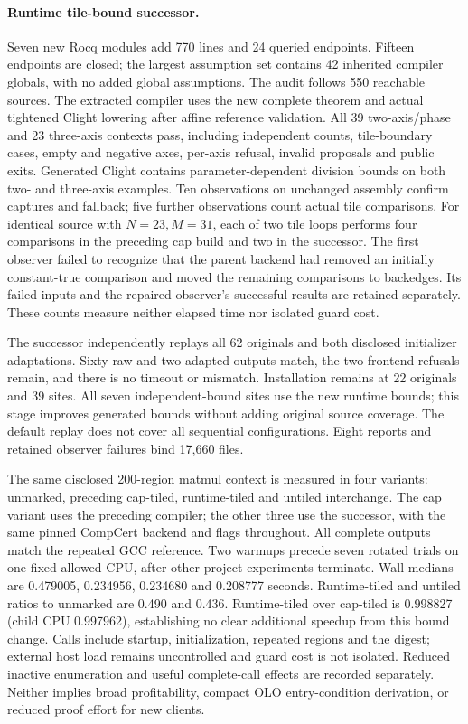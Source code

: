 \paragraph{Runtime tile-bound successor.}
Seven new Rocq modules add 770 lines and 24 queried endpoints. Fifteen endpoints
are closed; the largest assumption set contains 42 inherited compiler globals,
with no added global assumptions. The audit follows 550 reachable sources.
The extracted compiler uses the new complete theorem and actual tightened
Clight lowering after affine reference validation. All 39 two-axis/phase and
23 three-axis contexts pass, including independent counts, tile-boundary cases,
empty and negative axes, per-axis refusal, invalid proposals and public exits.
Generated Clight contains parameter-dependent division bounds on both two- and
three-axis examples. Ten observations on unchanged assembly confirm captures
and fallback; five further observations count actual tile comparisons.
For identical source with $N=23,M=31$, each of two tile loops performs four
comparisons in the preceding cap build and two in the successor. The first
observer failed to recognize that the parent backend had removed an initially
constant-true comparison and moved the remaining comparisons to backedges.
Its failed inputs and the repaired observer's successful results are retained
separately. These counts measure neither elapsed time nor isolated guard cost.

The successor independently replays all 62 originals and both disclosed
initializer adaptations. Sixty raw and two adapted outputs match, the two
frontend refusals remain, and there is no timeout or mismatch. Installation
remains at 22 originals and 39 sites. All seven independent-bound sites use
the new runtime bounds; this stage improves generated bounds without adding
original source coverage. The default replay does not cover all sequential
configurations. Eight reports and retained observer failures bind 17,660 files.

The same disclosed 200-region matmul context is measured in four variants:
unmarked, preceding cap-tiled, runtime-tiled and untiled interchange. The cap
variant uses the preceding compiler; the other three use the successor, with
the same pinned CompCert backend and flags throughout. All complete outputs
match the repeated GCC reference. Two warmups precede seven rotated trials
on one fixed allowed CPU, after other project experiments terminate. Wall
medians are 0.479005, 0.234956, 0.234680 and 0.208777 seconds. Runtime-tiled and
untiled ratios to unmarked are 0.490 and 0.436. Runtime-tiled over cap-tiled is
0.998827 (child CPU 0.997962), establishing no clear additional speedup from
this bound change. Calls include startup, initialization, repeated regions and
the digest; external host load remains uncontrolled and guard cost is not
isolated. Reduced inactive enumeration and useful complete-call effects are
recorded separately. Neither implies broad profitability, compact OLO
entry-condition derivation, or reduced proof effort for new clients.

